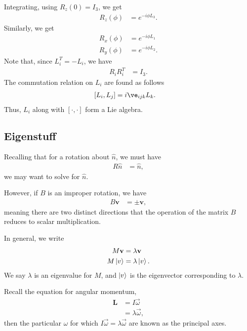 \documentclass[10pt]{mypackage}
\begin{document}
Integrating, using $R_z\left(0\right) = I_{3}$, we get
\begin{align*}
  R_z\left(\phi\right) &= e^{-i\phi L_{3}}.
\end{align*}
Similarly, we get
\begin{align*}
  R_x\left(\phi\right) &= e^{-i\phi L_{1}}\\
  R_y\left(\phi\right) &= e^{-i\phi L_{2}}.
\end{align*}
Note that, since $L_{i}^{T} = -L_{i}$, we have
\begin{align*}
  R_{i}R_{i}^T &= I_{3}.
\end{align*}
The commutation relation on $L_{i}$ are found as follows
\begin{align*}
  \left[L_{i},L_{j}\right] &= i\ve_{ijk}L_{k}.
\end{align*}
Thus, $L_{i}$ along with $\left[\cdot,\cdot\right]$ form a Lie algebra.
\subsection{Eigenstuff}%
Recalling that for a rotation about $\hat{n}$, we must have
\begin{align*}
  R\hat{n} &= \hat{n},
\end{align*}
we may want to solve for $\hat{n}$.\newline

However, if $B$ is an improper rotation, we have
\begin{align*}
  B\mathbf{v} &= \pm\mathbf{v},
\end{align*}
meaning there are two distinct directions that the operation of the matrix $B$ reduces to scalar multiplication.\newline

In general, we write
\begin{align*}
  M\mathbf{v} &= \lambda \mathbf{v}\\
  M\ket{v} &= \lambda \ket{v}.
\end{align*}
We say $\lambda$ is an eigenvalue for $M$, and $\ket{v}$ is the eigenvector corresponding to $\lambda$.\newline

Recall the equation for angular momentum,
\begin{align*}
  \mathbf{L} &= I\vec{\omega}\\
             &= \lambda \vec{\omega},
\end{align*}
then the particular $\omega$ for which $I\vec{\omega} = \lambda \vec{\omega}$ are known as the principal axes.
\end{document}

